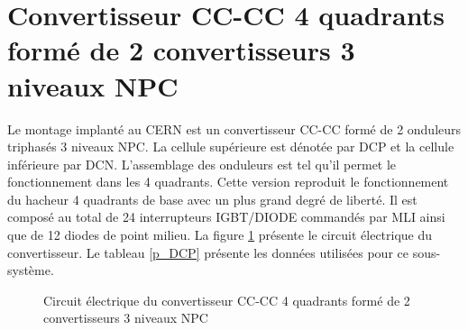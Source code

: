\section{Convertisseur CC-CC 4 quadrants formé de 2 convertisseurs 3 niveaux NPC}
Le montage implanté au CERN est un convertisseur CC-CC formé de 2 onduleurs triphasés 3 niveaux NPC. La cellule supérieure est dénotée par DCP et la cellule inférieure par DCN. L'assemblage des onduleurs est tel qu'il permet le fonctionnement dans les 4 quadrants. Cette version reproduit le fonctionnement du hacheur 4 quadrants de base avec un plus grand degré de liberté. Il est composé au total de 24 interrupteurs IGBT/DIODE commandés par MLI ainsi que de 12 diodes de point milieu. La figure \ref{circuit_DCP_DCN} présente le circuit électrique du convertisseur. Le tableau \ref{p_DCP} présente les données utilisées pour ce sous-système.


\begin{figure}[htb]
\caption{Circuit électrique du convertisseur CC-CC 4 quadrants formé de 2 convertisseurs 3 niveaux NPC}
\label{circuit_DCP_DCN}
\end{figure}


